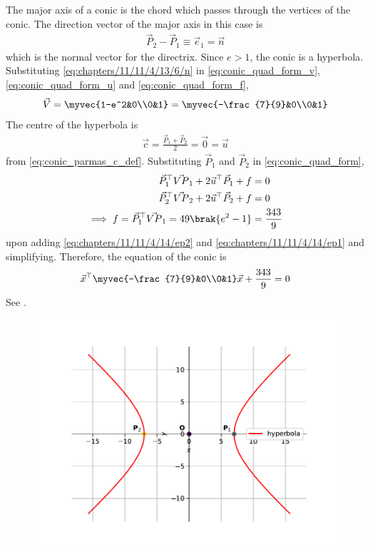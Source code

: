    The major axis of a conic is the chord which passes through the vertices of the conic.
    The direction vector of the major axis in this case is
    \begin{align}
        \vec{P}_2-\vec{P}_1 \equiv \vec{e}_1 = \vec{n}
\label{eq:chapters/11/11/4/13/6/n} 
    \end{align}
    which is the normal vector for the directrix.
    Since $e > 1$, the conic is a hyperbola.
Substituting  
\eqref{eq:chapters/11/11/4/13/6/n} 
in
  \eqref{eq:conic_quad_form_v},
\eqref{eq:conic_quad_form_u}
and
\eqref{eq:conic_quad_form_f},
\begin{align}
	\vec{V} = \myvec{1-e^2&0\\0&1} = \myvec{-\frac{7}{9}&0\\0&1} \label{eq:chapters/11/11/4/14/6} 
\end{align}
    The centre of the hyperbola is 
\begin{align}
	\vec{c} = \frac{\vec{P}_1+\vec{P}_2}{2} = \vec{0} = \vec{u}
\end{align}
from \eqref{eq:conic_parmas_c_def}.      Substituting $\vec{P}_1$ and $\vec{P}_2$ in 
    \eqref{eq:conic_quad_form},
    \begin{align}
        \vec{P}_1^\top\vec{VP}_1 + 2\vec{u}^\top\vec{P}_1 + f &= 0 \label{eq:chapters/11/11/4/14/ep1} \\
        \vec{P}_2^\top\vec{VP}_2 + 2\vec{u}^\top\vec{P}_2 + f &= 0 \label{eq:chapters/11/11/4/14/ep2}
	\\
	    \implies f = \vec{P}_1^\top\vec{VP}_1  = 49\brak{e^2-1}&=\frac{343}{9}
    \end{align}
    upon adding 
    \eqref{eq:chapters/11/11/4/14/ep2} and \eqref{eq:chapters/11/11/4/14/ep1}
    and simplifying.
    Therefore, the equation of the conic is
    \begin{align}
        \vec{x}^\top\myvec{-\frac{7}{9}&0\\0&1}\vec{x} + \frac{343}{9} = 0
    \end{align}
See .
    \begin{figure}[H]
        \centering
        \includegraphics[width=0.75\columnwidth]{chapters/11/11/4/14/figs/fig.pdf}
        \caption{}
        \label{fig:chapters/11/11/4/14/hyperbola}
    \end{figure}
